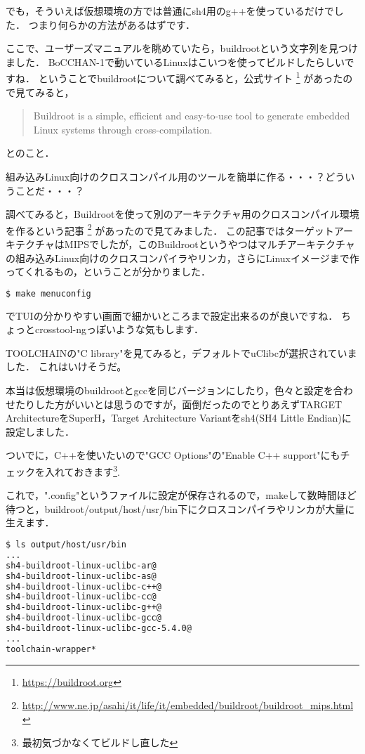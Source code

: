 でも，そういえば仮想環境の方では普通にsh4用のg++を使っているだけでした．
つまり何らかの方法があるはずです．

ここで、ユーザーズマニュアルを眺めていたら，buildrootという文字列を見つけました．
BoCCHAN-1で動いているLinuxはこいつを使ってビルドしたらしいですね．
ということでbuildrootについて調べてみると，公式サイト
\footnote{\url{https://buildroot.org}}
があったので見てみると，

\begin{quote}
Buildroot is a simple, efficient and easy-to-use tool to generate embedded Linux systems through cross-compilation.
\end{quote}

とのこと．

組み込みLinux向けのクロスコンパイル用のツールを簡単に作る・・・？どういうことだ・・・？

調べてみると，Buildrootを使って別のアーキテクチャ用のクロスコンパイル環境を作るという記事
\footnote{\url{http://www.ne.jp/asahi/it/life/it/embedded/buildroot/buildroot_mips.html}}
があったので見てみました．
この記事ではターゲットアーキテクチャはMIPSでしたが，このBuildrootというやつはマルチアーキテクチャの組み込みLinux向けのクロスコンパイラやリンカ，さらにLinuxイメージまで作ってくれるもの，ということが分かりました．

\begin{lstlisting}[language=bash]
$ make menuconfig
\end{lstlisting}

でTUIの分かりやすい画面で細かいところまで設定出来るのが良いですね．
ちょっとcrosstool-ngっぽいような気もします．

TOOLCHAINの"C library"を見てみると，デフォルトでuClibcが選択されていました．
これはいけそうだ。

本当は仮想環境のbuildrootとgccを同じバージョンにしたり，色々と設定を合わせたりした方がいいとは思うのですが，面倒だったのでとりあえずTARGET ArchitectureをSuperH，Target Architecture Variantをsh4(SH4 Little Endian)に設定しました．

ついでに，C++を使いたいので"GCC Options"の"Enable C++ support"にもチェックを入れておきます\footnote{最初気づかなくてビルドし直した}.

これで，".config"というファイルに設定が保存されるので，makeして数時間ほど待つと，buildroot/output/host/usr/bin下にクロスコンパイラやリンカが大量に生えます．

\begin{lstlisting}[language=bash]
$ ls output/host/usr/bin
...
sh4-buildroot-linux-uclibc-ar@
sh4-buildroot-linux-uclibc-as@
sh4-buildroot-linux-uclibc-c++@
sh4-buildroot-linux-uclibc-cc@
sh4-buildroot-linux-uclibc-g++@
sh4-buildroot-linux-uclibc-gcc@
sh4-buildroot-linux-uclibc-gcc-5.4.0@
...
toolchain-wrapper*
\end{lstlisting}

